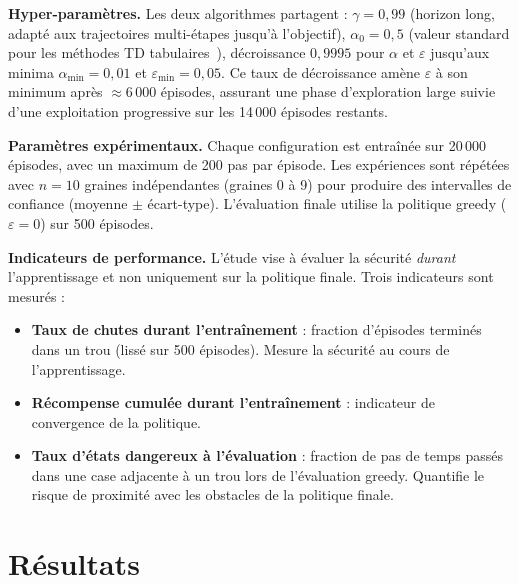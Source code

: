 \documentclass{article}
\begin{document}
\textbf{Hyper-paramètres.} Les deux algorithmes partagent : $\gamma = 0{,}99$ (horizon long, adapté aux trajectoires multi-étapes jusqu'à l'objectif), $\alpha_0 = 0{,}5$ (valeur standard pour les méthodes TD tabulaires~\citep{sutton2018}), décroissance $0{,}9995$ pour $\alpha$ et $\varepsilon$ jusqu'aux minima $\alpha_{\min}=0{,}01$ et $\varepsilon_{\min}=0{,}05$. Ce taux de décroissance amène $\varepsilon$ à son minimum après $\approx\!6\,000$ épisodes, assurant une phase d'exploration large suivie d'une exploitation progressive sur les 14\,000 épisodes restants.

\textbf{Paramètres expérimentaux.} Chaque configuration est entraînée sur 20\,000 épisodes, avec un maximum de 200 pas par épisode. Les expériences sont répétées avec $n=10$ graines indépendantes (graines 0 à 9) pour produire des intervalles de confiance (moyenne $\pm$ écart-type). L'évaluation finale utilise la politique greedy ($\varepsilon=0$) sur 500 épisodes.

\textbf{Indicateurs de performance.} L'étude vise à évaluer la sécurité \emph{durant} l'apprentissage et non uniquement sur la politique finale. Trois indicateurs sont mesurés :
\begin{itemize}
  \item \textbf{Taux de chutes durant l'entraînement} : fraction d'épisodes terminés dans un trou (lissé sur 500 épisodes). Mesure la sécurité au cours de l'apprentissage.
  \item \textbf{Récompense cumulée durant l'entraînement} : indicateur de convergence de la politique.
  \item \textbf{Taux d'états dangereux à l'évaluation} : fraction de pas de temps passés dans une case adjacente à un trou lors de l'évaluation greedy. Quantifie le risque de proximité avec les obstacles de la politique finale.
\end{itemize}


\section{Résultats}
\end{document}
